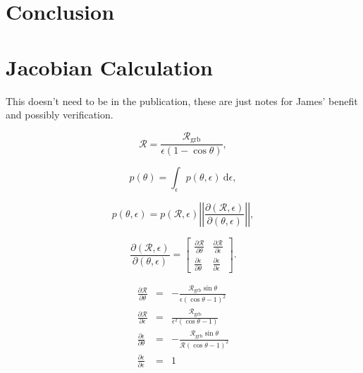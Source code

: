 \documentclass[nofootinbib]{revtex4}
\newcommand{\grbrate}{{{\mathcal R}_{\mathrm{grb}}}}
\newcommand{\cbcrate}{{{\mathcal R}}}
\newcommand{\diff}{{\mathrm d}}
\begin{document}
\section{Conclusion}

\appendix
\section{Jacobian Calculation}
This doesn't need to be in the publication, these are just notes for James'
benefit and possibly verification.

\begin{equation}
\cbcrate=\frac{\grbrate}{\epsilon(1-\cos \theta)},
\end{equation}

\begin{equation}
p(\theta) = \int_{\epsilon} p(\theta,\epsilon)~\diff \epsilon,
\end{equation}

\begin{equation}
p(\theta,\epsilon) = p(\cbcrate,\epsilon)
\left\lvert\left\lvert
\frac{\partial(\cbcrate,\epsilon)}{\partial(\theta,\epsilon)}
\right\rvert\right\rvert,
\end{equation}

\begingroup
\renewcommand*{\arraystretch}{1.5}

\begin{equation}
\frac{\partial (\cbcrate,\epsilon)}{\partial(\theta,\epsilon)} =
\begin{bmatrix}
\frac{\partial \cbcrate}{\partial \theta} & \frac{\partial \cbcrate}{\partial \epsilon} \\
\frac{\partial \epsilon}{\partial \theta} & \frac{\partial \epsilon}{\partial \epsilon}
\end{bmatrix}.
\end{equation}

\endgroup

\begin{eqnarray}
\frac{\partial \cbcrate}{\partial \theta} & = &
-\frac{\grbrate\sin\theta}{\epsilon(\cos\theta - 1)^2}\\
\frac{\partial \cbcrate}{\partial \epsilon} & = &
\frac{\grbrate}{\epsilon^2(\cos\theta-1)}\\
\frac{\partial \epsilon}{\partial \theta} & = &
-\frac{\grbrate\sin\theta}{\cbcrate(\cos\theta-1)^2}\\
\frac{\partial \epsilon}{\partial \epsilon} & = & 1\\
\end{eqnarray}
\end{document}
